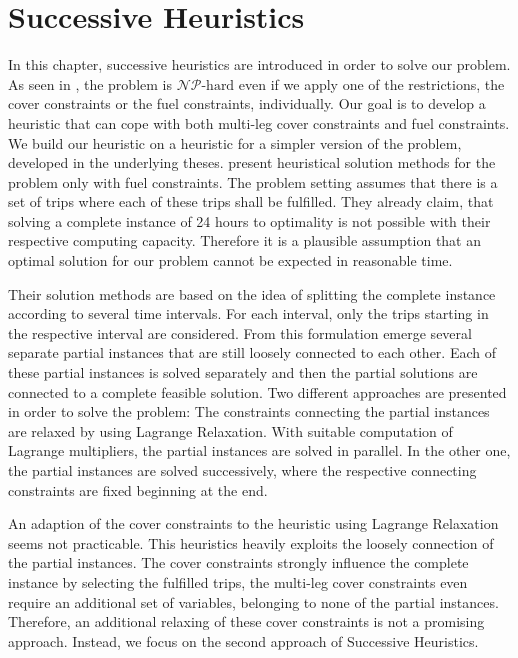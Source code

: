 \chapter{Successive Heuristics}
\label{ch:heuristics}

In this chapter, successive heuristics are introduced in order to solve our problem. As seen in , the problem is ${\mathcal{NP}\text{-hard}}$ even if we apply one of the restrictions, the cover constraints or the fuel constraints, individually. Our goal is to develop a heuristic that can cope with both multi-leg cover constraints and fuel constraints. We build our heuristic on a heuristic for a simpler version of the problem, developed in the underlying theses. \cite{Knoll} present heuristical solution methods for the problem only with fuel constraints. The problem setting assumes that there is a set of trips where each of these trips shall be fulfilled. They already claim, that solving a complete instance of 24 hours to optimality is not possible with their respective computing capacity. Therefore it is a plausible assumption that an optimal solution for our problem cannot be expected in reasonable time. 

Their solution methods are based on the idea of splitting the complete instance according to several time intervals. For each interval, only the trips starting in the respective interval are considered. From this formulation emerge several separate partial instances that are still loosely connected to each other. Each of these partial instances is solved separately and then the partial solutions are connected to a complete feasible solution. Two different approaches are presented in order to solve the problem: The constraints connecting the partial instances are relaxed by using Lagrange Relaxation. With suitable computation of Lagrange multipliers, the partial instances are solved in parallel. In the other one, the partial instances are solved successively, where the respective connecting constraints are fixed beginning at the end.

An adaption of the cover constraints to the heuristic using Lagrange Relaxation seems not practicable. This heuristics heavily exploits the loosely connection of the partial instances. The cover constraints strongly influence the complete instance by selecting the fulfilled trips, the multi-leg cover constraints even require an additional set of variables, belonging to none of the partial instances. Therefore, an additional relaxing of these cover constraints is not a promising approach. Instead, we focus on the second approach of Successive Heuristics.

